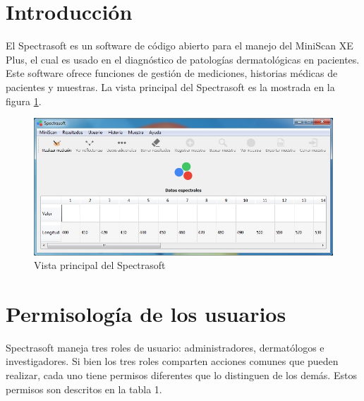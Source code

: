 \section*{Introducci\'{o}n}
	El Spectrasoft es un software de c\'{o}digo abierto para el manejo del MiniScan XE Plus, el cual es usado en el diagn\'{o}stico de patolog\'{i}as dermatol\'{o}gicas en pacientes. Este software ofrece funciones de gesti\'{o}n de mediciones, historias m\'{e}dicas de pacientes y muestras. La vista principal del Spectrasoft es la mostrada en la figura \ref{fig:vista-principal}.
\vfill
\begin{figure}[H]
  \centering
  \includegraphics[width=1\linewidth]{./img/vista-principal.jpg}
\caption[]{Vista principal del Spectrasoft\label{fig:vista-principal}}
\end{figure}
\vfill
\newpage

\section*{Permisolog\'{i}a de los usuarios}

	Spectrasoft maneja tres roles de usuario: administradores, dermat\'{o}logos e investigadores. Si bien los tres roles comparten acciones comunes que pueden realizar, cada uno tiene permisos diferentes que lo distinguen de los dem\'{a}s. Estos permisos son descritos en la tabla 1.


